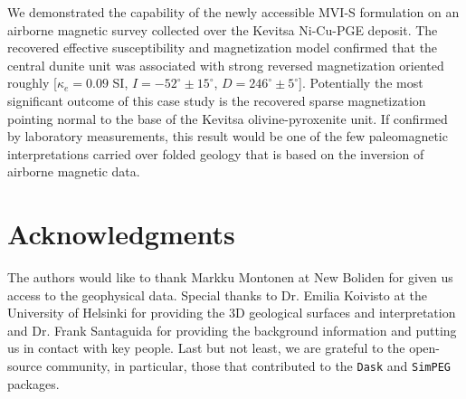 \documentclass[paper]{geophysics}
\begin{document}
We demonstrated the capability of the newly accessible MVI-S formulation on an airborne magnetic survey collected over the Kevitsa Ni-Cu-PGE deposit. The recovered effective susceptibility and magnetization model confirmed that the central dunite unit was associated with strong reversed magnetization oriented roughly [$\kappa_{e} = 0.09$ SI, $I=-52^\circ \pm 15^\circ$, $D=246^\circ \pm 5^\circ$].
Potentially the most significant outcome of this case study is the recovered sparse magnetization pointing normal to the base of the Kevitsa olivine-pyroxenite unit. If confirmed by laboratory measurements, this result would be one of the few paleomagnetic interpretations carried over folded geology that is based on the inversion of airborne magnetic data.

\section{Acknowledgments}
The authors would like to thank Markku Montonen at New Boliden for given us access to the geophysical data. Special thanks to Dr. Emilia Koivisto at the University of Helsinki for providing the 3D geological surfaces and interpretation and Dr. Frank Santaguida for providing the background information and putting us in contact with key people. Last but not least, we are grateful to the open-source community, in particular, those that contributed to the \texttt{Dask} and \texttt{SimPEG} packages.

\pagebreak
% 







\end{document}
